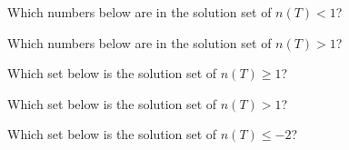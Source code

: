 \documentclass{ximera}
\begin{document}
\begin{exercise}
Which numbers below are in the solution set of $n(T) < 1$?
\begin{selectAll}
\end{selectAll}
\end{exercise}






\begin{exercise}
Which numbers below are in the solution set of $n(T) > 1$?
\begin{selectAll}
\end{selectAll}
\end{exercise}





\begin{exercise}
Which set below is the solution set of $n(T) \geq 1$?
\begin{multipleChoice}
\choice{$[1, 4]$}
\choice[correct]{$[-4, -1] \cup [1, 4]$}
\choice{$\varnothing$}
\end{multipleChoice}
\end{exercise}



\begin{exercise}
Which set below is the solution set of $n(T) > 1$?
\begin{multipleChoice}
\choice{$[1, 4]$}
\choice{$[-4, -1] \cup [1, 4]$}
\choice{$\varnothing$}
\end{multipleChoice}
\end{exercise}


\begin{exercise}
Which set below is the solution set of $n(T) \leq -2$?
\begin{multipleChoice}
\choice{$[-4, 1) \cup [1, 4]$}
\choice{$[-4, 1) \cup (1, 4]$}
\choice{$[1, 2.2]$}
\choice[correct]{$\varnothing$}
\end{multipleChoice}
\end{exercise}
\end{document}

